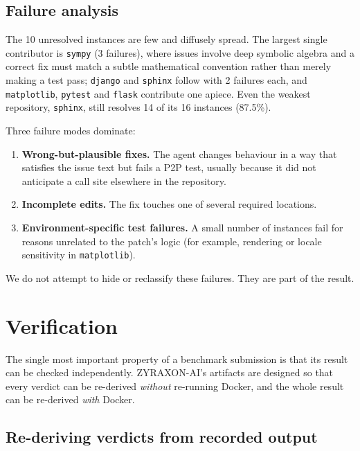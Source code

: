 \documentclass[11pt,a4paper]{article}
\begin{document}
\subsection{Failure analysis}

The 10 unresolved instances are few and diffusely spread. The largest single
contributor is \texttt{sympy} (3 failures), where issues involve deep symbolic algebra
and a correct fix must match a subtle mathematical convention rather than merely making a
test pass; \texttt{django} and \texttt{sphinx} follow with 2 failures each, and
\texttt{matplotlib}, \texttt{pytest} and \texttt{flask} contribute one apiece. Even the
weakest repository, \texttt{sphinx}, still resolves 14 of its 16 instances (87.5\%).

Three failure modes dominate:

\begin{enumerate}[leftmargin=1.4em]
  \item \textbf{Wrong-but-plausible fixes.} The agent changes behaviour in a way that
  satisfies the issue text but fails a P2P test, usually because it did not anticipate a
  call site elsewhere in the repository.
  \item \textbf{Incomplete edits.} The fix touches one of several required locations.
  \item \textbf{Environment-specific test failures.} A small number of instances fail
  for reasons unrelated to the patch's logic (for example, rendering or locale
  sensitivity in \texttt{matplotlib}).
\end{enumerate}

We do not attempt to hide or reclassify these failures. They are part of the result.

\section{Verification}
\label{sec:verify}

The single most important property of a benchmark submission is that its result can be
checked independently. ZYRAXON-AI's artifacts are designed so that every verdict can be
re-derived \emph{without} re-running Docker, and the whole result can be re-derived
\emph{with} Docker.

\subsection{Re-deriving verdicts from recorded output}
\end{document}
